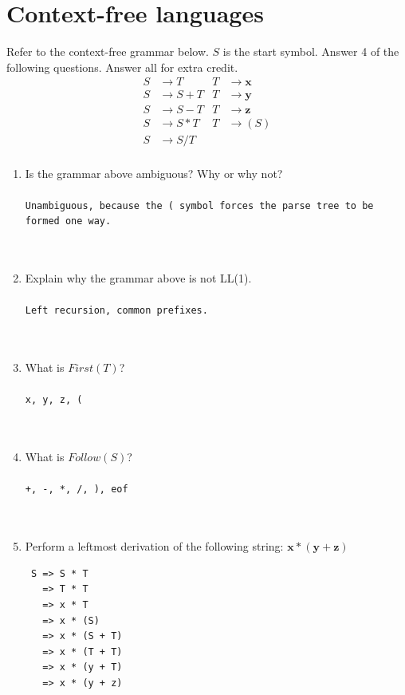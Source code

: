 \documentclass[10pt]{amsart}
\begin{document}
\section{Context-free languages}
Refer to the context-free grammar below. $S$ is the start symbol. Answer 4 of the following questions. Answer all for extra credit.
\begin{align*}
S &\to T &  T &\to \mathbf{x}\\
S &\to S + T &    T &\to \mathbf{y}\\
S &\to S - T &    T &\to \mathbf{z}\\
S &\to S * T &    T &\to ( S )\\
 S &\to S / T\\
\end{align*}
 \begin{enumerate}
\item Is the grammar above ambiguous? Why or why not?\\\\
\verb+Unambiguous, because the ( symbol forces the parse tree to be formed one way.+\\\\\\
\item Explain why the grammar above is not LL(1).\\\\
\verb+Left recursion, common prefixes.+\\\\\\
\item What is $First(T)$?\\\\
\verb+x, y, z, (+
\\\\\\ 
\item What is $Follow(S)$?\\\\
\verb$+, -, *, /, ), eof$
\\\\\\ %
\item Perform a leftmost derivation of the following string: $\mathbf{x}*(\mathbf{y}+\mathbf{z})$
\begin{verbatim}
 S => S * T
   => T * T
   => x * T
   => x * (S)
   => x * (S + T)
   => x * (T + T)
   => x * (y + T)
   => x * (y + z)
\end{verbatim}
\end{enumerate}
\end{document}
